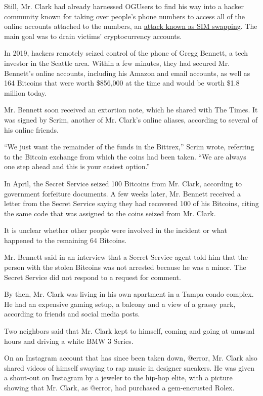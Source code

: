 Still, Mr. Clark had already harnessed OGUsers to find his way into a
hacker community known for taking over people's phone numbers to access
all of the online accounts attached to the numbers, an
\href{https://www.nytimes3xbfgragh.onion/2017/08/21/business/dealbook/phone-hack-bitcoin-virtual-currency.html}{attack
known as SIM swapping}. The main goal was to drain victims'
cryptocurrency accounts.

In 2019, hackers remotely seized control of the phone of Gregg Bennett,
a tech investor in the Seattle area. Within a few minutes, they had
secured Mr. Bennett's online accounts, including his Amazon and email
accounts, as well as 164 Bitcoins that were worth \$856,000 at the time
and would be worth \$1.8 million today.

Mr. Bennett soon received an extortion note, which he shared with The
Times. It was signed by Scrim, another of Mr. Clark's online aliases,
according to several of his online friends.

``We just want the remainder of the funds in the Bittrex,'' Scrim wrote,
referring to the Bitcoin exchange from which the coins had been taken.
``We are always one step ahead and this is your easiest option.''

In April, the Secret Service seized 100 Bitcoins from Mr. Clark,
according to government forfeiture documents. A few weeks later, Mr.
Bennett received a letter from the Secret Service saying they had
recovered 100 of his Bitcoins, citing the same code that was assigned to
the coins seized from Mr. Clark.

It is unclear whether other people were involved in the incident or what
happened to the remaining 64 Bitcoins.

Mr. Bennett said in an interview that a Secret Service agent told him
that the person with the stolen Bitcoins was not arrested because he was
a minor. The Secret Service did not respond to a request for comment.

By then, Mr. Clark was living in his own apartment in a Tampa condo
complex. He had an expensive gaming setup, a balcony and a view of a
grassy park, according to friends and social media posts.

Two neighbors said that Mr. Clark kept to himself, coming and going at
unusual hours and driving a white BMW 3 Series.

On an Instagram account that has since been taken down, @error, Mr.
Clark also shared videos of himself swaying to rap music in designer
sneakers. He was given a shout-out on Instagram by a jeweler to the
hip-hop elite, with a picture showing that Mr. Clark, as @error, had
purchased a gem-encrusted Rolex.

